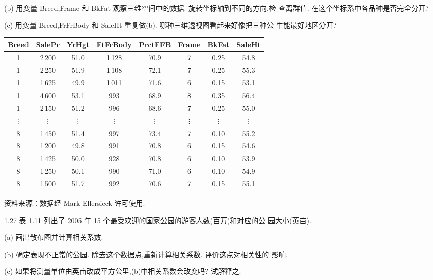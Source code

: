 
(b) 用变量 Breed,Frame 和 BkFat 观察三维空间中的数据. 旋转坐标轴到不同的方向,检
查离群值. 在这个坐标系中各品种是否完全分开?

(c) 用变量 Breed,FrFrBody 和 SaleHt 重复做(b). 哪种三维透视图看起来好像把三种公
牛能最好地区分开?

\begin{mvtable}
\label{tab:1.10}
\begin{tabular}{cccccccc}
\toprule
Breed & SalePr & YrHgt & FtFrBody & PrctFFB & Frame & BkFat & SaleHt \\
\midrule
1 & 2\,200 & 51.0 & 1\,128 & 70.9 & 7 & 0.25 & 54.8 \\
1 & 2\,250 & 51.9 & 1\,108 & 72.1 & 7 & 0.25 & 55.3 \\
1 & 1\,625 & 49.9 & 1\,011 & 71.6 & 6 & 0.15 & 53.1 \\
1 & 4\,600 & 53.1 & 993 & 68.9 & 8 & 0.35 & 56.4 \\
1 & 2\,150 & 51.2 & 996 & 68.6 & 7 & 0.25 & 55.0 \\
$\vdots$ & $\vdots$ & $\vdots$ & $\vdots$ & $\vdots$ & $\vdots$ & $\vdots$ & $\vdots$ \\
8 & 1\,450 & 51.4 & 997 & 73.4 & 7 & 0.10 & 55.2 \\
8 & 1\,200 & 49.8 & 991 & 70.8 & 6 & 0.15 & 54.6 \\
8 & 1\,425 & 50.0 & 928 & 70.8 & 6 & 0.10 & 53.9 \\
8 & 1\,250 & 50.1 & 990 & 71.0 & 6 & 0.10 & 54.9 \\
8 & 1\,500 & 51.7 & 992 & 70.6 & 7 & 0.15 & 55.1 \\
\bottomrule
\end{tabular}

{ 资料来源：数据经 Mark Ellersieck 许可使用.}
\end{mvtable}

1.27 \hyperref[tab:1.11]{表 1.11} 列出了 2005 年 15 个最受欢迎的国家公园的游客人数(百万)和对应的公
园大小(英亩).

(a) 画出散布图并计算相关系数.

(b) 确定表现不正常的公园. 除去这个数据点,重新计算相关系数. 评价这点对相关性的
影响.

(c) 如果将测量单位由英亩改成平方公里,(b)中相关系数会改变吗? 试解释之.

